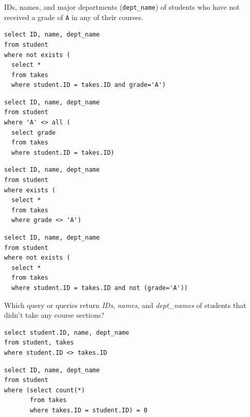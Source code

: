 \documentclass[12pt]{exam}
\begin{document}
\begin{questions}
\begin{minipage}{\linewidth}
\question[8]
IDs, names, and major departments (\texttt{dept\_name}) of students who have not received a grade of \texttt{A} in any of their courses.\par\vspace{0.5em}

\begin{checkboxes}
\CorrectChoice
\begin{verbatim}
select ID, name, dept_name
from student
where not exists (
  select *
  from takes
  where student.ID = takes.ID and grade='A')
\end{verbatim}

\CorrectChoice
\begin{verbatim}
select ID, name, dept_name
from student
where 'A' <> all (
  select grade
  from takes
  where student.ID = takes.ID)
\end{verbatim}

\choice
\begin{verbatim}
select ID, name, dept_name
from student
where exists (
  select *
  from takes
  where grade <> 'A')
\end{verbatim}

\choice
\begin{verbatim}
select ID, name, dept_name
from student
where not exists (
  select *
  from takes
  where student.ID = takes.ID and not (grade='A'))
\end{verbatim}

\end{checkboxes}
\end{minipage}

\begin{minipage}{\linewidth}
\question[8]
Which query or queries return \textit{IDs}, \textit{names}, and \textit{dept\_names} of students that didn’t take any course sections?\par\vspace{0.5em}

\begin{checkboxes}
\choice
\begin{verbatim}
select student.ID, name, dept_name
from student, takes
where student.ID <> takes.ID
\end{verbatim}

\CorrectChoice
\begin{verbatim}
select ID, name, dept_name
from student
where (select count(*) 
       from takes 
       where takes.ID = student.ID) = 0
\end{verbatim}


\end{checkboxes}
\end{minipage}
\end{questions}
\end{document}
